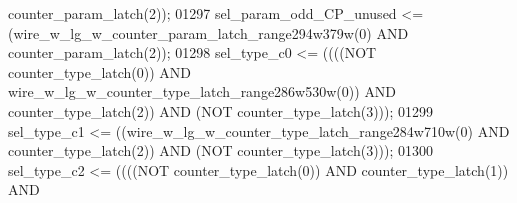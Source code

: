 \begin{DoxyCode}
{{      counter_param_latch}\textcolor{vhdlchar}{(}\textcolor{vhdllogic}{}\textcolor{vhdllogic}{2}\textcolor{vhdlchar}{)}\textcolor{vhdlchar}{)};
01297     \textcolor{vhdlchar}{sel_param_odd_CP_unused} \textcolor{vhdlchar}{<=} \textcolor{vhdlchar}{(}\textcolor{vhdlchar}{wire_w_lg_w_counter_param_latch_range294w379w}\textcolor{vhdlchar}{(}\textcolor{vhdllogic}{}\textcolor{vhdllogic}{0}\textcolor{vhdlchar}{)} \textcolor{keywordflow}{AND} \textcolor{vhdlchar}{
      counter_param_latch}\textcolor{vhdlchar}{(}\textcolor{vhdllogic}{}\textcolor{vhdllogic}{2}\textcolor{vhdlchar}{)}\textcolor{vhdlchar}{)};
01298     \textcolor{vhdlchar}{sel_type_c0} \textcolor{vhdlchar}{<=} \textcolor{vhdlchar}{(}\textcolor{vhdlchar}{(}\textcolor{vhdlchar}{(}\textcolor{vhdlchar}{(}\textcolor{keywordflow}{NOT} \textcolor{vhdlchar}{counter_type_latch}\textcolor{vhdlchar}{(}\textcolor{vhdllogic}{}\textcolor{vhdllogic}{0}\textcolor{vhdlchar}{)}\textcolor{vhdlchar}{)} \textcolor{keywordflow}{AND} \textcolor{vhdlchar}{
      wire_w_lg_w_counter_type_latch_range286w530w}\textcolor{vhdlchar}{(}\textcolor{vhdllogic}{}\textcolor{vhdllogic}{0}\textcolor{vhdlchar}{)}\textcolor{vhdlchar}{)} \textcolor{keywordflow}{AND} \textcolor{vhdlchar}{counter_type_latch}\textcolor{vhdlchar}{(}\textcolor{vhdllogic}{}\textcolor{vhdllogic}{2}\textcolor{vhdlchar}{)}\textcolor{vhdlchar}{)} \textcolor{keywordflow}{AND} \textcolor{vhdlchar}{(}\textcolor{keywordflow}{NOT} \textcolor{vhdlchar}{
      counter_type_latch}\textcolor{vhdlchar}{(}\textcolor{vhdllogic}{}\textcolor{vhdllogic}{3}\textcolor{vhdlchar}{)}\textcolor{vhdlchar}{)}\textcolor{vhdlchar}{)};
01299     \textcolor{vhdlchar}{sel_type_c1} \textcolor{vhdlchar}{<=} \textcolor{vhdlchar}{(}\textcolor{vhdlchar}{(}\textcolor{vhdlchar}{wire_w_lg_w_counter_type_latch_range284w710w}\textcolor{vhdlchar}{(}\textcolor{vhdllogic}{}\textcolor{vhdllogic}{0}\textcolor{vhdlchar}{)} \textcolor{keywordflow}{AND} \textcolor{vhdlchar}{
      counter_type_latch}\textcolor{vhdlchar}{(}\textcolor{vhdllogic}{}\textcolor{vhdllogic}{2}\textcolor{vhdlchar}{)}\textcolor{vhdlchar}{)} \textcolor{keywordflow}{AND} \textcolor{vhdlchar}{(}\textcolor{keywordflow}{NOT} \textcolor{vhdlchar}{counter_type_latch}\textcolor{vhdlchar}{(}\textcolor{vhdllogic}{}\textcolor{vhdllogic}{3}\textcolor{vhdlchar}{)}\textcolor{vhdlchar}{)}\textcolor{vhdlchar}{)};
01300     \textcolor{vhdlchar}{sel_type_c2} \textcolor{vhdlchar}{<=} \textcolor{vhdlchar}{(}\textcolor{vhdlchar}{(}\textcolor{vhdlchar}{(}\textcolor{vhdlchar}{(}\textcolor{keywordflow}{NOT} \textcolor{vhdlchar}{counter_type_latch}\textcolor{vhdlchar}{(}\textcolor{vhdllogic}{}\textcolor{vhdllogic}{0}\textcolor{vhdlchar}{)}\textcolor{vhdlchar}{)} \textcolor{keywordflow}{AND} \textcolor{vhdlchar}{counter_type_latch}\textcolor{vhdlchar}{(}\textcolor{vhdllogic}{}\textcolor{vhdllogic}{1}\textcolor{vhdlchar}{)}\textcolor{vhdlchar}{)} \textcolor{keywordflow}{AND} \textcolor{vhdlchar}{
}}
\end{DoxyCode}
